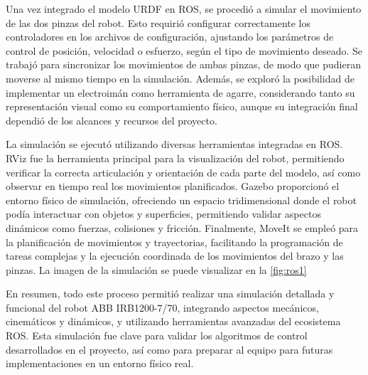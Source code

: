 Una vez integrado el modelo URDF en ROS, se procedió a simular el movimiento de las dos pinzas del robot. Esto requirió configurar correctamente los controladores en los archivos de configuración, ajustando los parámetros de control de posición, velocidad o esfuerzo, según el tipo de movimiento deseado. Se trabajó para sincronizar los movimientos de ambas pinzas, de modo que pudieran moverse al mismo tiempo en la simulación. Además, se exploró la posibilidad de implementar un electroimán como herramienta de agarre, considerando tanto su representación visual como su comportamiento físico, aunque su integración final dependió de los alcances y recursos del proyecto.

La simulación se ejecutó utilizando diversas herramientas integradas en ROS. RViz fue la herramienta principal para la visualización del robot, permitiendo verificar la correcta articulación y orientación de cada parte del modelo, así como observar en tiempo real los movimientos planificados. Gazebo proporcionó el entorno físico de simulación, ofreciendo un espacio tridimensional donde el robot podía interactuar con objetos y superficies, permitiendo validar aspectos dinámicos como fuerzas, colisiones y fricción. Finalmente, MoveIt se empleó para la planificación de movimientos y trayectorias, facilitando la programación de tareas complejas y la ejecución coordinada de los movimientos del brazo y las pinzas. La imagen de la simulación se puede visualizar en la  \autoref{fig:ros1}

En resumen, todo este proceso permitió realizar una simulación detallada y funcional del robot ABB IRB1200-7/70, integrando aspectos mecánicos, cinemáticos y dinámicos, y utilizando herramientas avanzadas del ecosistema ROS. Esta simulación fue clave para validar los algoritmos de control desarrollados en el proyecto, así como para preparar al equipo para futuras implementaciones en un entorno físico real.